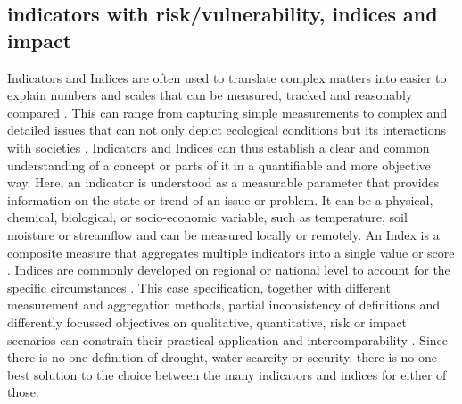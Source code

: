 {%

\subsection{indicators with risk/vulnerability, indices and impact}\label{subsec:indicators} %

Indicators and Indices are often used to translate complex matters into easier to explain numbers and scales that can be measured, tracked and reasonably compared \autocite{blauveltSystematizingEnvironmentalIndicators2014,williamsUsingIndicatorsExplain2017}. This can range from capturing simple measurements to complex and detailed issues that can not only depict ecological conditions but its interactions with societies \autocite{blauveltSystematizingEnvironmentalIndicators2014,mishraWaterSecurityChanging2021}. Indicators and Indices can thus establish a clear and common understanding of a concept or parts of it in a quantifiable and more objective way.
Here, an indicator is understood as a measurable parameter that provides information on the state or trend of an issue or problem. It can be a physical, chemical, biological, or socio-economic variable, such as temperature, soil moisture or streamflow and can be measured locally or remotely. An Index is a composite measure that aggregates multiple indicators into a single value or score \autocite{unitednationsuniversityTooManyIndicators2017,williamsUsingIndicatorsExplain2017, svobodaHandbookDroughtIndicators2016}. Indices are commonly developed on regional or national level to account for the specific circumstances \autocite{unitednationsuniversityTooManyIndicators2017}. This case specification, together with different measurement and aggregation methods, partial inconsistency of definitions and differently focussed objectives on qualitative, quantitative, risk or impact scenarios can constrain their practical application and intercomparability \autocite{svobodaHandbookDroughtIndicators2016,unitednationsuniversityTooManyIndicators2017}. 
Since there is no one definition of drought, water scarcity or security, there is no one best solution to the choice between the many indicators and indices for either of those.



}
